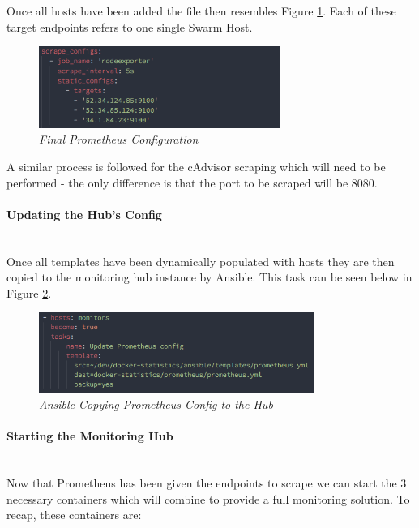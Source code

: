 Once all hosts have been added the file then resembles Figure \ref{fig:prometheus-after}. Each of these target endpoints refers to one single Swarm Host.

\begin{figure}[!h]
\centering
\includegraphics*[width=0.7\textwidth]{components/images/prometheus-after}
\caption{\em Final Prometheus Configuration}
\label{fig:prometheus-after}
\end{figure}

A similar process is followed for the cAdvisor scraping which will need to be performed - the only difference is that the port to be scraped will be 8080. 

\paragraph{Updating the Hub's Config}\mbox{}\\
Once all templates have been dynamically populated with hosts they are then copied to the monitoring hub instance by Ansible. This task can be seen below in Figure \ref{fig:copy-prometheus}.

\begin{figure}[!h]
\centering
\includegraphics*[width=0.8\textwidth]{components/images/copy-prometheus}
\caption{\em Ansible Copying Prometheus Config to the Hub}
\label{fig:copy-prometheus}
\end{figure}

\paragraph{Starting the Monitoring Hub}\mbox{}\\
Now that Prometheus has been given the endpoints to scrape we can start the 3 necessary containers which will combine to provide a full monitoring solution. To recap, these containers are:

